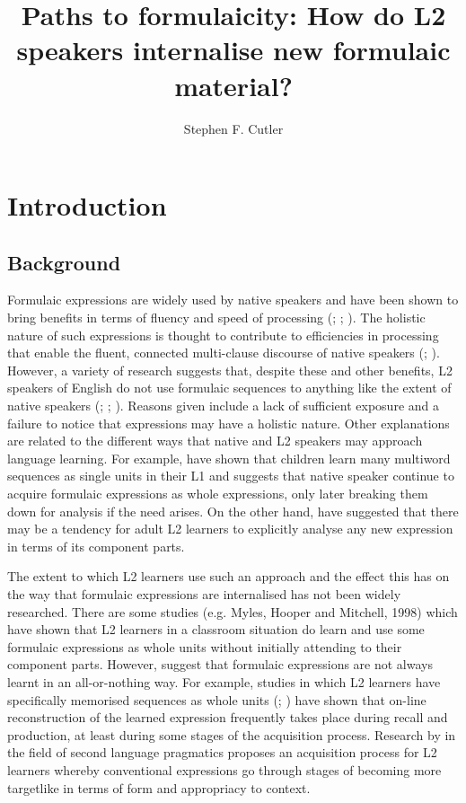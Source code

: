 \documentclass[output=paper]{langscibook}
\author{Stephen F. Cutler\affiliation{Cardiff University}\orcid{}}
\title[Paths to formulaicity: How do L2 speakers internalise formulaic material?]{Paths to formulaicity: How do L2 speakers internalise new formulaic material?}
\begin{document}
\maketitle 

\section{Introduction} 
\subsection{Background}

Formulaic expressions are widely used by native speakers and have been shown to bring benefits in terms of fluency and speed of processing (\citealt{Siyanova-ChanturiaSidtis2019}; \citealt{TowellEtAl1996}; \citealt{Wray2002}). The holistic nature of such expressions is thought to contribute to efficiencies in processing that enable the fluent, connected multi-clause discourse of native speakers (\citealt{PawleySyder1983}; \citealt{TremblayBaayen2010}). However, a variety of research suggests that, despite these and other benefits, L2 speakers of English do not use formulaic sequences to anything like the extent of native speakers (\citealt{Granger2019}; \citealt{Meunier2012}; \citealt{PaquotGranger2012}). Reasons given include a lack of sufficient exposure and a failure to notice that expressions may have a holistic nature. Other explanations \citep{Wray2019} are related to the different ways that native and L2 speakers may approach language learning. For example, \citet{DabrowskaLieven2005} have shown that children learn many multiword sequences as single units in their L1 and \citet{Wray2002} suggests that native speaker continue to acquire formulaic expressions as whole expressions, only later breaking them down for analysis if the need arises. On the other hand, \citet{WrayPerkins2000} have suggested that there may be a tendency for adult L2 learners to explicitly analyse any new expression in terms of its component parts. 

The extent to which L2 learners use such an approach and the effect this has on the way that formulaic expressions are internalised has not been widely researched. There are some studies (e.g. Myles, Hooper and Mitchell, 1998) which have shown that L2 learners in a classroom situation do learn and use some formulaic expressions as whole units without initially attending to their component parts. However, \citet{SchmittCarter2004} suggest that formulaic expressions are not always learnt in an all-or-nothing way. For example, studies in which L2 learners have specifically memorised sequences as whole units (\citealt{BoersLindstromberg2012}; \citealt{WrayFitzpatrick2008}) have shown that on-line reconstruction of the learned expression frequently takes place during recall and production, at least during some stages of the acquisition process. Research by \citet{Bardovi-Harlig2019} in the field of second language pragmatics proposes an acquisition process for L2 learners whereby conventional expressions go through stages of becoming more targetlike in terms of form and appropriacy to context. 
\end{document}
